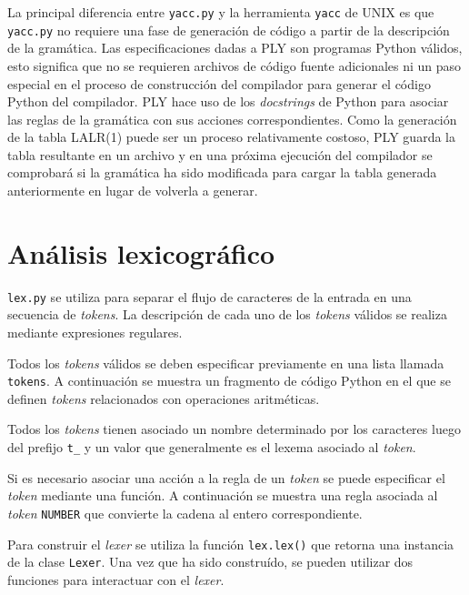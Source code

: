 \documentclass{article}
\begin{document}
La principal diferencia entre \texttt{yacc.py} y la herramienta \texttt{yacc}
de UNIX es que \texttt{yacc.py} no requiere una fase de generación de código a
partir de la descripción de la gramática. Las especificaciones dadas a PLY son
programas Python válidos, esto significa que no se requieren archivos de código
fuente adicionales ni un paso especial en el proceso de construcción del
compilador para generar el código Python del compilador. PLY hace uso de los
\emph{docstrings} de Python para asociar las reglas de la gramática con sus
acciones correspondientes. Como la generación de la tabla LALR(1) puede ser un
proceso relativamente costoso, PLY guarda la tabla resultante en un archivo y en 
una próxima ejecución del compilador se comprobará si la gramática ha sido
modificada para cargar la tabla generada anteriormente en lugar de volverla a
generar.

\section{Análisis lexicográfico}

\texttt{lex.py} se utiliza para separar el flujo de caracteres de la entrada en
una secuencia de \textit{tokens}. La descripción de cada uno de los
\textit{tokens} válidos se realiza mediante expresiones regulares.

Todos los \textit{tokens} válidos se deben especificar previamente en una lista
llamada \texttt{tokens}. A continuación se muestra un fragmento de código
Python en el que se definen \textit{tokens} relacionados con operaciones
aritméticas.

\begin{quote}

\end{quote}

Todos los \textit{tokens} tienen asociado un nombre determinado por los
caracteres luego del prefijo \texttt{t\_} y un valor que generalmente es el
lexema asociado al \textit{token}.

Si es necesario asociar una acción a la regla de un \textit{token} se puede
especificar el \textit{token} mediante una función. A continuación se muestra
una regla asociada al \textit{token} \texttt{NUMBER} que convierte la cadena al
entero correspondiente.

\begin{quote}

\end{quote}

Para construir el \textit{lexer} se utiliza la función \texttt{lex.lex()} que
retorna una instancia de la clase \texttt{Lexer}. Una vez que ha sido
construído, se pueden utilizar dos funciones para interactuar con el
\textit{lexer}.
\end{document}
